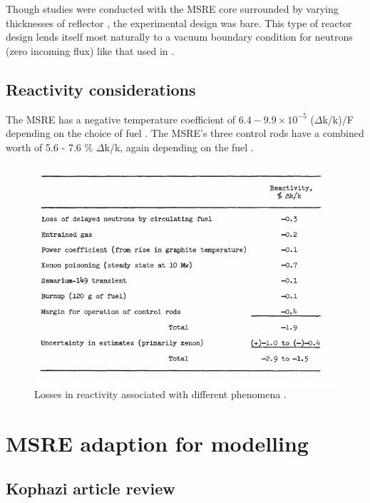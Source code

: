\documentclass{article}
\let\Oldsection\section
\renewcommand{\section}{\FloatBarrier\Oldsection}
\let\Oldsubsection\subsection
\renewcommand{\subsection}{\FloatBarrier\Oldsubsection}
\begin{document}
Though studies were conducted with the \gls{MSRE} core surrounded by varying
thicknesses of reflector \cite{haubenreich_msre_1964}, the experimental design
was bare. This type of reactor design lends itself most naturally to a vacuum
boundary condition for neutrons (zero incoming flux) like that used in
\cite{dulla_neutron_2004}.

\subsection{Reactivity considerations}

The \gls{MSRE} has a negative temperature coefficient of $6.4 - 9.9 \times10^{-5}$
($\Delta$k/k)/\textdegree F depending on the choice of
fuel \cite{robertson_msre_1965}. The \gls{MSRE}'s three control rods have a combined
worth of 5.6 - 7.6 \% $\Delta$k/k, again depending on the
fuel \cite{robertson_msre_1965}.

\begin{figure}[htpb]
  \centering
  \includegraphics[max height=.5\textheight,max width=\textwidth,keepaspectratio]{reactivity-losses.png}
  \caption{Losses in reactivity associated with different
    phenomena \cite{robertson_msre_1965}.}
  \label{fig:reactivity_losses}
\end{figure}

\section{\gls{MSRE} adaption for modelling}

\subsection{Kophazi article review}
\end{document}
